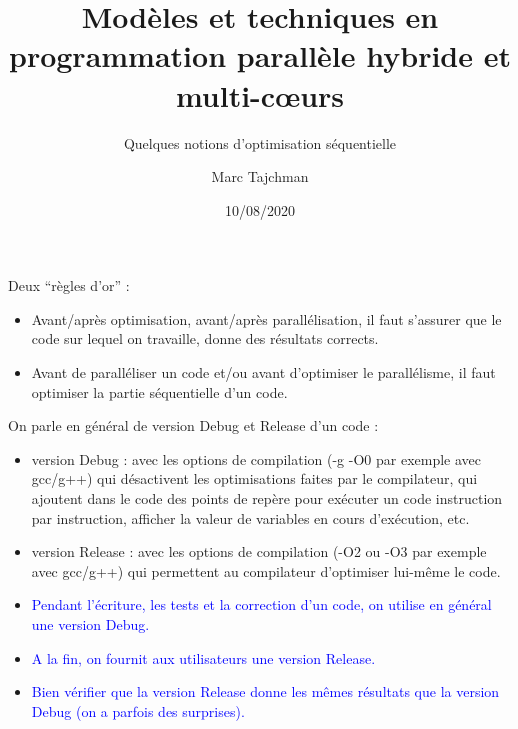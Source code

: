 \documentclass{beamer}
\title{Modèles et techniques en programmation parallèle hybride et multi-c\oe urs}
\subtitle{Quelques notions d'optimisation séquentielle}
\author{Marc Tajchman}\institute{CEA - DEN/DM2S/STMF/LMES}
\date{10/08/2020}
\begin{document}
\begin{frame}
\titlepage
\end{frame}

\large
\begin{frame}
	Deux ``règles d'or'' :
		\bigskip

	\begin{itemize}
		\item Avant/après optimisation, avant/après parallélisation, il faut s'assurer que le code sur lequel on travaille, donne des résultats corrects.
		\bigskip
		
		\item Avant de paralléliser un code et/ou avant d'optimiser le parallélisme, il faut optimiser la partie séquentielle d'un code.
	\end{itemize}

\end{frame}

\begin{frame}

On parle en général de version Debug et Release d'un code :
{\small
\begin{itemize}
	\item version Debug : avec les options de compilation (-g -O0 par exemple avec gcc/g++) qui désactivent les optimisations faites par le compilateur, qui ajoutent dans le code des points de repère pour exécuter un code instruction par instruction, afficher la valeur de variables en cours d'exécution, etc.
	
	\item version Release : avec les options de compilation (-O2 ou -O3 par exemple avec gcc/g++) qui permettent au compilateur d'optimiser lui-même le code.
\end{itemize}
}
\vfill

\begin{itemize}
	\item[\textbullet] \textcolor{blue}{
		Pendant l'écriture, les tests et la correction d'un code, on utilise en général une version Debug. }
	\item[\textbullet] \textcolor{blue}{
		A la fin, on fournit aux utilisateurs une version Release.}
	\item[\textbullet] \textcolor{blue}{
		Bien vérifier que la version Release donne les mêmes résultats que la version Debug (on a parfois des surprises).}
\end{itemize}

\end{frame}
\end{document}
